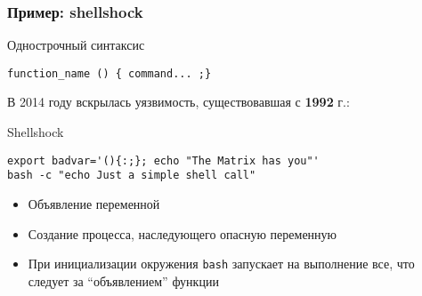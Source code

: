 \begin{frame}[fragile]
	\frametitle{Пример: shellshock}
	\begin{block}{Однострочный синтаксис}
			\begin{lstlisting}
function_name () { command... ;}
\end{lstlisting}
	\end{block}

    В 2014 году вскрылась уязвимость, существовавшая с {\bf 1992} г.:

	\begin{block}{Shellshock}
			\begin{lstlisting}
export badvar='(){:;}; echo "The Matrix has you"'
bash -c "echo Just a simple shell call"
\end{lstlisting}
	\begin{itemize}
	    \item Объявление переменной
	    \item Создание процесса, наследующего опасную переменную
	    \item При инициализации окружения {\tt bash} запускает на выполнение все, что следует за ``объявлением'' функции
	\end{itemize}
	\end{block}

\end{frame}

